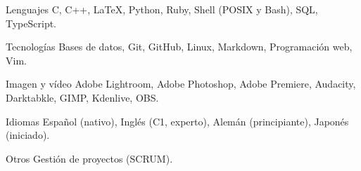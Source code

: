 
\begin{cvskills}

\cvskill%
	{Lenguajes} %
	{C, C++, LaTeX, Python, Ruby, Shell (POSIX y Bash), SQL, TypeScript.} %

\cvskill%
	{Tecnologías}
	{Bases de datos, Git, GitHub, Linux, Markdown, Programación web, Vim.}

\cvskill%
	{Imagen y vídeo}
	{Adobe Lightroom, Adobe Photoshop, Adobe Premiere, Audacity, Darktabkle, GIMP, Kdenlive, OBS.}

\cvskill%
	{Idiomas}
	{Español (nativo), Inglés (C1, experto), Alemán (principiante), Japonés (iniciado).}

\cvskill%
	{Otros}
	{Gestión de proyectos (SCRUM).}

\end{cvskills}
